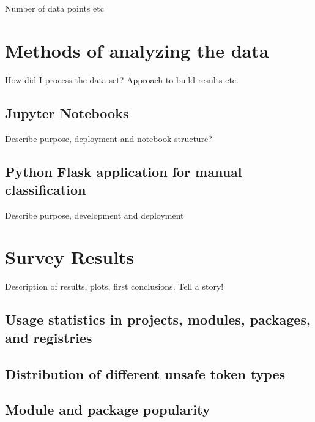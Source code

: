 Number of data points etc



\section{Methods of analyzing the data}\label{sec:survey-analysis-methods}

How did I process the data set? Approach to build results etc.


\subsection{Jupyter Notebooks}

Describe purpose, deployment and notebook structure?


\subsection{Python Flask application for manual classification}

Describe purpose, development and deployment



\section{Survey Results}\label{sec:survey-results}

Description of results, plots, first conclusions. Tell a story!


\subsection{Usage statistics in projects, modules, packages, and registries}\label{subsec:results-stats}


\subsection{Distribution of different unsafe token types}\label{subsec:results-tokens}


\subsection{Module and package popularity}\label{subsec:results-popularity}


